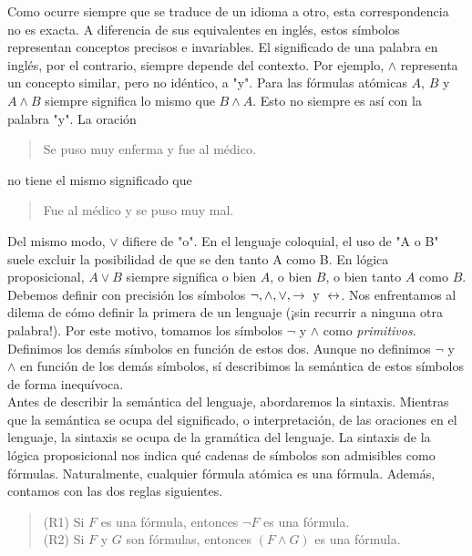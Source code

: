 \message{ !name(main.tex)}\documentclass[12pt,a4paper]{book}
\newcommand{\comillas}[1]{"#1"}
\begin{document}
    Como ocurre siempre que se traduce de un idioma a otro, esta correspondencia no es exacta. A diferencia de sus equivalentes en inglés,
    estos símbolos representan conceptos precisos e invariables. El significado de una palabra en inglés, por el contrario, siempre depende
    del contexto. Por ejemplo, $\wedge$ representa un concepto similar, pero no idéntico, a \comillas{y}. Para las fórmulas atómicas
    $A$, $B$ y $A\wedge B$ siempre significa lo mismo que $B\wedge A$. Esto no siempre es así con la palabra \comillas{y}. La oración

    \begin{quote}
        Se puso muy enferma y fue al médico.
    \end{quote}

    no tiene el mismo significado que

    \begin{quote}
        Fue al médico y se puso muy mal.
    \end{quote}

    Del mismo modo, $\vee$ difiere de \comillas{o}. En el lenguaje coloquial, el uso de \comillas{A o B} suele excluir la posibilidad
    de que se den tanto A como B. En lógica proposicional, $A\vee B$ siempre significa o bien $A$, o bien $B$, o bien tanto $A$
    como $B$.\\
    Debemos definir con precisión los símbolos $\neg,\wedge,\vee,\rightarrow\text{ y }\leftrightarrow$. Nos enfrentamos
    al dilema de cómo definir la primera de un lenguaje (¡sin recurrir a ninguna otra palabra!). Por este motivo,
    tomamos los símbolos $\neg$ y $\wedge$ como \textit{primitivos}. Definimos los demás símbolos en función de
    estos dos. Aunque no definimos $\neg$ y $\wedge$ en función de los demás símbolos, sí describimos la semántica
    de estos símbolos de forma inequívoca.\\
    Antes de describir la semántica del lenguaje, abordaremos la sintaxis. Mientras que la semántica se ocupa del significado, o interpretación,
    de las oraciones en el lenguaje, la sintaxis se ocupa de la gramática del lenguaje. La sintaxis de la lógica proposicional nos indica
    qué cadenas de símbolos son admisibles como fórmulas. Naturalmente, cualquier fórmula atómica es una fórmula. Además, contamos con las dos
    reglas siguientes.

    \begin{quote}
        (R1) Si $F$ es una fórmula, entonces $\neg F$ es una fórmula.\\
        (R2) Si $F$ y $G$ son fórmulas, entonces $(F\wedge G)$ es una fórmula.
    \end{quote}
\end{document}
